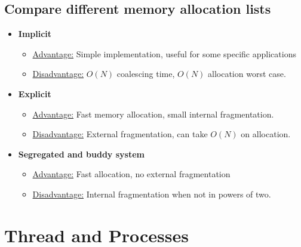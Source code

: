 \documentclass[a4paper]{article}
\begin{document}
\subsection{Compare different memory allocation lists} %
\label{sub:Compare differen memory allocation lists}
\begin{itemize}
  \item {\bf Implicit }
    \begin{itemize}
      \item \underline{Advantage:}  Simple implementation, useful for some specific applications
      \item \underline{Disadvantage:} $O(N)$ coalescing time, $O(N)$ allocation worst case.
    \end{itemize}
  \item {\bf Explicit }
    \begin{itemize}
      \item \underline{Advantage:} Fast memory allocation, small internal fragmentation.
      \item \underline{Disadvantage:} External fragmentation, can take $O(N)$ on allocation.
    \end{itemize}
  \item {\bf Segregated and buddy system}
    \begin{itemize}
      \item \underline{Advantage:} Fast allocation, no external fragmentation
      \item \underline{Disadvantage:} Internal fragmentation when not in powers of two.
    \end{itemize}
\end{itemize}
\section{Thread and Processes} %
\label{sec:Thread and Processes}
\end{document}
